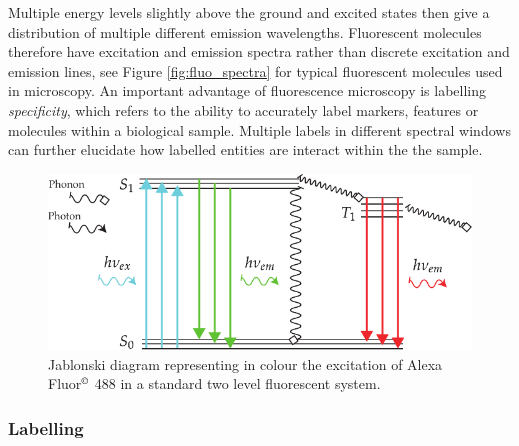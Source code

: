 Multiple energy levels slightly above the ground and excited states then give a distribution of multiple different emission wavelengths.
Fluorescent molecules therefore have excitation and emission spectra rather than discrete excitation and emission lines, see Figure \ref{fig:fluo_spectra} for typical fluorescent molecules used in microscopy.
An important advantage of fluorescence microscopy is labelling \emph{specificity}, which refers to the ability to accurately label markers, features or molecules within a biological sample.
Multiple labels in different spectral windows can further elucidate how labelled entities are interact within the the sample.

\begin{figure}
    \centering
    \includegraphics[width=0.7\linewidth]{jablonski_triplet_new}
    \caption[Standard jablonski diagram]{Jablonski diagram representing in colour the excitation of Alexa Fluor\(^{\copyright}\) 488 in a standard two level fluorescent system.}\label{fig:jablonski_triplet_new}
\end{figure}

\subsubsection{Labelling}


